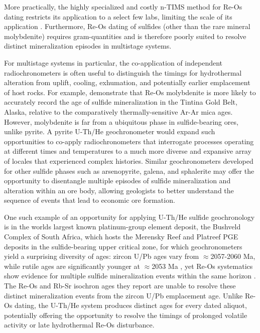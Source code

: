 More practically, the highly specialized and costly n-TIMS method for
Re-Os dating restricts its application to a select few labs, limiting
the scale of its application \citep{ackerman2025}. Furthermore, Re-Os dating
of sulfides (other than the rare mineral molybdenite) requires
gram-quantities \citep{qi2010} and is therefore poorly suited to
resolve distinct mineralization episodes in multistage systems.

For multistage systems in particular, the co-application of independent
radiochronometers is often useful to distinguish the timings for
hydrothermal alteration from uplift, cooling, exhumation, and
potentially earlier emplacement of host rocks. For example, \citet{selby2002}
demonstrate that Re-Os molybdenite is more likely to accurately
record the age of sulfide mineralization in the Tintina Gold Belt,
Alaska, relative to the comparatively thermally-sensitive Ar-Ar mica
ages. However, molybdenite is far from a ubiquitous phase in
sulfide-bearing ores, unlike pyrite. A pyrite U-Th/He geochronometer
would expand such opportunities to co-apply radiochronometers that
interrogate processes operating at different times and temperatures to a
much more diverse and expansive array of locales that experienced
complex histories. Similar geochronometers developed for other sulfide
phases such as arsenopyrite, galena, and sphalerite may offer the
opportunity to disentangle multiple episodes of sulfide mineralization
and alteration within an ore body, allowing geologists to better
understand the sequence of events that lead to economic ore formation.

One such example of an opportunity for applying U-Th/He sulfide
geochronology is in the world\textquotesingle s largest known
platinum-group element deposit, the Bushveld Complex of South Africa,
which hosts the Merensky Reef and Platreef PGE deposits in the sulfide-bearing
upper critical zone, for which geochronometers yield a surprising diversity of ages:
zircon U/Pb ages vary from $\approx$2057-2060 Ma, while rutile ages are significantly younger at $\approx$2053 Ma 
\citep{scoates2021}, yet Re-Os systematics show evidence for
multiple sulfide mineralization events within the same horizon
\citep{schoenberg1999}. The Re-Os and Rb-Sr isochron ages they report
are unable to resolve these distinct mineralization events from the
zircon U/Pb emplacement age. Unlike Re-Os dating, the U-Th/He system
produces distinct ages for every dated aliquot, potentially offering the
opportunity to resolve the timings of prolonged volatile activity or
late hydrothermal Re-Os disturbance.

